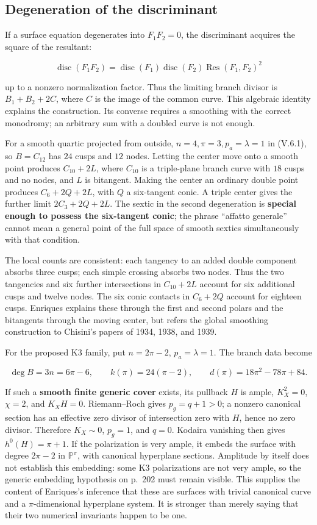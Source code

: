 \subsection{Degeneration of the discriminant}

If a surface equation degenerates into \(F_1F_2=0\), the discriminant acquires the square of the resultant:

\[
\operatorname{disc}(F_1F_2)
=\operatorname{disc}(F_1)\operatorname{disc}(F_2)
 \operatorname{Res}(F_1,F_2)^2
\]

up to a nonzero normalization factor. Thus the limiting branch divisor is \(B_1+B_2+2C\), where \(C\) is the image of the common curve. This algebraic identity explains the construction. Its converse requires a smoothing with the correct monodromy; an arbitrary sum with a doubled curve is not enough.

For a smooth quartic projected from outside, \(n=4,\pi=3,p_a=\lambda=1\) in (V.6.1), so \(B=C_{12}\) has \(24\) cusps and \(12\) nodes. Letting the center move onto a smooth point produces \(C_{10}+2L\), where \(C_{10}\) is a triple-plane branch curve with \(18\) cusps and no nodes, and \(L\) is bitangent. Making the center an ordinary double point produces \(C_6+2Q+2L\), with \(Q\) a six-tangent conic. A triple center gives the further limit \(2C_3+2Q+2L\). The sextic in the second degeneration is \textbf{special enough to possess the six-tangent conic}; the phrase ``affatto generale'' cannot mean a general point of the full space of smooth sextics simultaneously with that condition.

The local counts are consistent: each tangency to an added double component absorbs three cusps; each simple crossing absorbs two nodes. Thus the two tangencies and six further intersections in \(C_{10}+2L\) account for six additional cusps and twelve nodes. The six conic contacts in \(C_6+2Q\) account for eighteen cusps. Enriques explains these through the first and second polars and the bitangents through the moving center, but refers the global smoothing construction to Chisini's papers of 1934, 1938, and 1939.

For the proposed K3 family, put \(n=2\pi-2\), \(p_a=\lambda=1\). The branch data become

\[
\deg B=3n=6\pi-6,\qquad
k(\pi)=24(\pi-2),\qquad
d(\pi)=18\pi^2-78\pi+84.
\]

If such a \textbf{smooth finite generic cover} exists, its pullback \(H\) is ample, \(K_X^2=0\), \(\chi=2\), and \(K_X H=0\). Riemann--Roch gives \(p_g=q+1>0\); a nonzero canonical section has an effective zero divisor of intersection zero with \(H\), hence no zero divisor. Therefore \(K_X\sim0\), \(p_g=1\), and \(q=0\). Kodaira vanishing then gives \(h^0(H)=\pi+1\). If the polarization is very ample, it embeds the surface with degree \(2\pi-2\) in \(\mathbb P^\pi\), with canonical hyperplane sections. Amplitude by itself does not establish this embedding: some K3 polarizations are not very ample, so the generic embedding hypothesis on p.~202 must remain visible. This supplies the content of Enriques's inference that these are surfaces with trivial canonical curve and a \(\pi\)-dimensional hyperplane system. It is stronger than merely saying that their two numerical invariants happen to be one.

